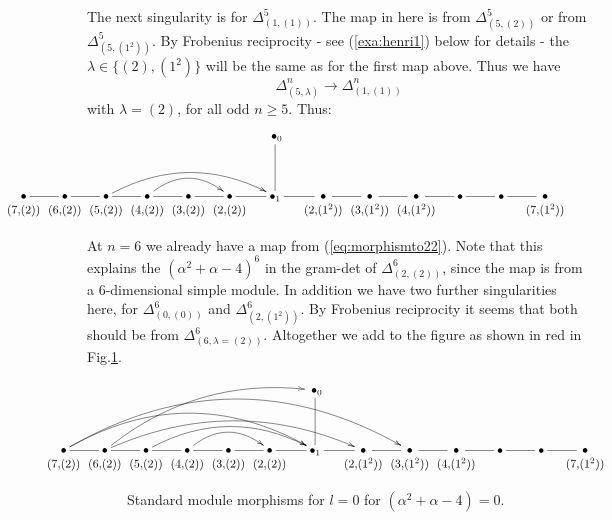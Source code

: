 \documentclass{article}
\newcommand{\ppm}[1]{\textcolor{red}{#1}}
\newcommand{\bajm}[1]{\textcolor{blue}{#1}}
\theoremstyle{definition}
\newcommand{\beq}{\begin{equation}}
\newcommand{\eq}{\end{equation}}
\numberwithin{equation}{subsection}
\begin{document}
The next singularity is for $\Delta^{5}_{(1,(1))}$. 
The map in here is from 
$\Delta^{5}_{(5,(2))}$ or from $\Delta^{5}_{(5,(1^2))}$. 
By Frobenius reciprocity 
- see (\ref{exa:henri1}) below for details - 
the $\lambda\in\{ (2),(1^2)\}$ will be the same as for the first map above. 
Thus we have 
\beq \label{eq:morphismto11} 
\Delta^n_{(5,\lambda)}  \rightarrow \Delta^n_{(1,(1))}
\eq 
with $\lambda=(2)$, 
for all odd $n \geq 5$. 
Thus: 
\[
\hspace{-2.1cm} 
\xymatrix{
   &&&&&& \;\bullet_0 \ar@{-}[d] \\
\ver{(7,\!(2))} \ar@{-}[r] & 
\ver{(6,\!(2))} \ar@{-}[r] & 
\ver{(5,\!(2))} \ar@{-}[r]  \ar@[red]@/^1.7pc/[rrrr] & 
\ver{(4,\!(2))} \ar@{-}[r] \ar@[red]@/^1.3pc/[rr] & 
\ver{(3,\!(2))} \ar@{-}[r] & 
\ver{(2,\!(2))} \ar@{-}[r] & 
\bullet_1 \ar@{-}[r] & 
\ver{(2,\!(1^2))} \ar@{-}[r] & 
\ver{(3,\!(1^2))} \ar@{-}[r] & 
\ver{(4,\!(1^2))} \ar@{-}[r] & 
\bullet \ar@{-}[r] & 
\bullet \ar@{-}[r] & 
\ver{(7,\!(1^2))} & 
}
\]

At $n=6$ we already have a map from  (\ref{eq:morphismto22}). 
Note that this explains the $(\alpha^2+\alpha-4)^6$ in the gram-det of 
$ \Delta^6_{(2,(2))}  $, since the map is   %
from a 6-dimensional simple module. 
In addition we have two further singularities here, for 
$ \Delta^6_{(0,(0))}  $    and   $ \Delta^6_{(2,(1^2))}  $. 
By Frobenius reciprocity it seems that both should be from 
$ \Delta^6_{(6,\lambda=(2))}  $. %
Altogether we add to the figure as shown in red in Fig.\ref{fig:standardmapshenri}. 

\begin{figure}
\[
\hspace{-2.1cm} 
\xymatrix{
   &&&&&& \;\bullet_0 \ar@{-}[d] \\
\ver{(7,\!(2))} \ar@{-}[r] \ar@[green]@/^2.643pc/[rrrrrr] \ar@[green]@/^3.643pc/[rrrrrrrr] & 
\ver{(6,\!(2))} \ar@{-}[r] \ar@[red]@/^1.7pc/[rrrrru] \ar@[red]@/^2.1pc/[rrrrrr] & 
\ver{(5,\!(2))} \ar@{-}[r]  \ar@[red]@/^1.7pc/[rrrr] & 
\ver{(4,\!(2))} \ar@{-}[r] \ar@[red]@/^1.3pc/[rr] & 
\ver{(3,\!(2))} \ar@{-}[r] & 
\ver{(2,\!(2))} \ar@{-}[r] & 
\bullet_1 \ar@{-}[r] & 
\ver{(2,\!(1^2))} \ar@{-}[r] & 
\ver{(3,\!(1^2))} \ar@{-}[r] & 
\ver{(4,\!(1^2))} \ar@{-}[r] & 
\bullet \ar@{-}[r] & 
\bullet \ar@{-}[r] & 
\ver{(7,\!(1^2))} & 
}
\]
    \caption{ Standard module morphisms for $l=0$ for $(\alpha^2+\alpha-4)=0$. \label{fig:standardmapshenri} }
\end{figure}
\end{document}
